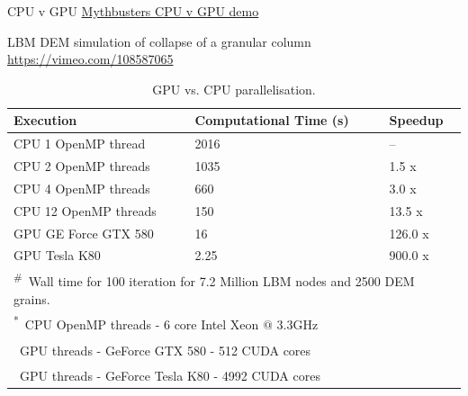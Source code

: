 \documentclass[10pt,times]{beamer}
\begin{document}
\begin{frame}{CPU v GPU}
\href{https://www.youtube.com/watch?v=-P28LKWTzrI}{Mythbusters CPU v GPU demo}
\end{frame}


\begin{frame}{LBM DEM simulation of collapse of a granular column}
\href{https://vimeo.com/108587065}{https://vimeo.com/108587065}

\begin{table}[tbhp]
	\caption{GPU vs. CPU parallelisation.}
	\label{table:GPU}
	\centering
	\begin{tabular}{l l l}
		\toprule
		Execution & Computational Time (s) &  Speedup \\
		\midrule
		CPU 1 OpenMP thread		& 2016	 & -- \\
		CPU 2 OpenMP threads	& 1035	 & 1.5 x \\
		CPU 4 OpenMP threads	& 660 	 & 3.0 x \\
		CPU 12 OpenMP threads	& 150	 & 13.5 x\\
		GPU GE Force GTX 580	& 16	 & 126.0 x \\
		GPU Tesla K80			& 2.25	 & 900.0 x \\
		\bottomrule
		\multicolumn{3}{l}{\footnotesize{\textsuperscript{\#}}~Wall time 
		for 100 iteration for 7.2 Million LBM nodes and 2500 DEM grains.} \\
		\multicolumn{3}{l}{\footnotesize{\textsuperscript{*}~CPU OpenMP threads 
		- 6 core Intel Xeon $\mathrm{@}$ 3.3GHz}} \\
		\multicolumn{3}{l}{\footnotesize{\textsuperscript{\dag}~GPU threads - 
		GeForce GTX 580 - 512 CUDA cores}} \\
		\multicolumn{3}{l}{\footnotesize{\textsuperscript{\dag*}~GPU threads - 
		GeForce Tesla K80 - 4992 CUDA cores}}
	\end{tabular}
\end{table}
\end{frame}
\end{document}
